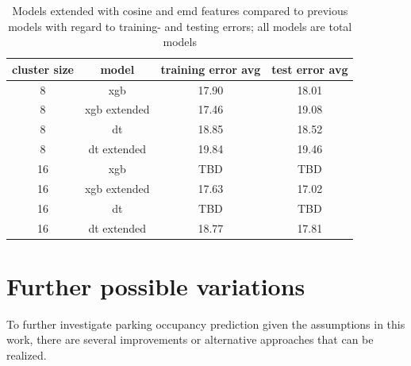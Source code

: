 {\begin{table}[!ht]
	{\color{green}
	\footnotesize
	\begin{tabular}{ | c | c | c | c | }
		\hline		
		\textbf{cluster size}  & \textbf{model} & \textbf{training error avg} & \textbf{test error avg} \\ \hline
		8 & {xgb} & 17.90 & 18.01 \\ \hline
		8 & {xgb extended} & 17.46 & 19.08 \\ \hline
		8 & {dt} & 18.85 & 18.52 \\ \hline
		8 & {dt extended} & 19.84 & 19.46 \\ \hline
		16 & {xgb} & TBD & TBD \\ \hline
		16 & {xgb extended} & 17.63 & 17.02 \\ \hline
		16 & {dt} & TBD & TBD \\ \hline
		16 & {dt extended} & 18.77 & 17.81 \\ \hline
	\end{tabular}}
	\caption{\color{green} Models extended with cosine and emd features compared to previous models with regard to training- and testing errors; all models are total models}
	\label{extensions:extended_models_comparison}
\end{table}

\section{Further possible variations}
\label{conclusion:future_work}
} %
To further investigate parking occupancy prediction given the assumptions in this work, there are several improvements or alternative approaches that can be realized.

